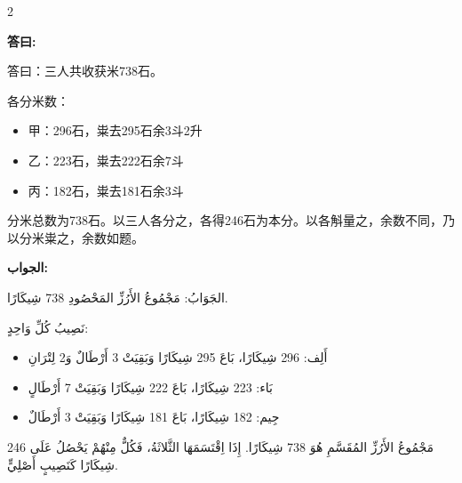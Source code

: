 \documentclass[11pt,a4paper]{article}
\newcommand{\ar}[1]{\arabicfont\beginR #1\endR}
\newenvironment{bilingual}{%
  \begin{paracol}{2}
}{%
  \end{paracol}
}
\newcommand{\cnlabel}[1]{\textcolor{algocolor}{\textbf{#1}}}
\newcommand{\arlabel}[1]{\ar{\textcolor{algocolor}{\textbf{#1}}}}
\begin{document}
\vspace{1em}

\begin{bilingual}

\begin{leftcolumn*}
\cnlabel{答曰:}

答曰：三人共收获米738石。

各分米数：
\begin{itemize}
  \item 甲：296石，粜去295石余3斗2升
  \item 乙：223石，粜去222石余7斗
  \item 丙：182石，粜去181石余3斗
\end{itemize}

分米总数为738石。以三人各分之，各得246石为本分。以各斛量之，余数不同，乃以分米粜之，余数如题。
\end{leftcolumn*}

\begin{rightcolumn*}
\arlabel{الجواب:}

\ar{الجَوَابُ: مَجْمُوعُ الأَرُزِّ المَحْصُودِ 738 شِيكَارًا.}

\ar{نَصِيبُ كُلِّ وَاحِدٍ:}
\begin{itemize}
  \item \ar{أَلِف: 296 شِيكَارًا، بَاعَ 295 شِيكَارًا وَبَقِيَتْ 3 أَرْطَالٌ وَ2 لِتْرَانِ}
  \item \ar{بَاء: 223 شِيكَارًا، بَاعَ 222 شِيكَارًا وَبَقِيَتْ 7 أَرْطَالٍ}
  \item \ar{جِيم: 182 شِيكَارًا، بَاعَ 181 شِيكَارًا وَبَقِيَتْ 3 أَرْطَالٌ}
\end{itemize}

\ar{مَجْمُوعُ الأَرُزِّ المُقَسَّمِ هُوَ 738 شِيكَارًا. إِذَا اِقْتَسَمَهَا الثَّلاثَةُ، فَكُلٌّ مِنْهُمْ يَحْصُلُ عَلَى 246 شِيكَارًا كَنَصِيبٍ أَصْلِيٍّ.}
\end{rightcolumn*}

\end{bilingual}

\vspace{1em}
\end{document}
